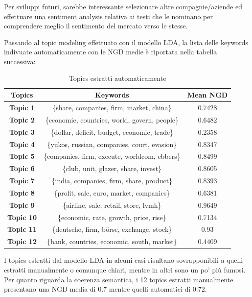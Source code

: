 \documentclass[]{article}
\begin{document}
Per sviluppi futuri, sarebbe interessante selezionare altre compagnie/aziende ed effettuare una sentiment analysis relativa ai testi che le nominano per comprendere meglio il sentimento del mercato verso le stesse.

Passando al topic modeling effettuato con il modello LDA, la lista delle keywords indivuate automaticamente con le NGD medie è riportata nella tabella successiva:

\begin{table}[H]
	\begin{center}
	\begin{tabular}{|c|c|c|}
		\hline 
		\textbf{Topics} & \textbf{Keywords} & \textbf{Mean NGD} \\ 
		\hline 
		\textbf{Topic 1} & \{share, companies, firm, market, china\} & 0.7428 \\ 
		\hline 
		\textbf{Topic 2} & \{economic, countries, world, govern, people\} & 0.6482 \\ 
		\hline 
		\textbf{Topic 3} & \{dollar, deficit, budget, economic, trade\} & 0.2358 \\ 
		\hline 
		\textbf{Topic 4} & \{yukos, russian, companies, court, evasion\} & 0.8347 \\ 
		\hline 
		\textbf{Topic 5} & \{companies, firm, execute, worldcom, ebbers\} & 0.8499 \\ 
		\hline 
		\textbf{Topic 6} & \{club, unit, glazer, share, invest\} & 0.8605 \\ 
		\hline 
		\textbf{Topic 7} & \{india, companies, firm, share, product\} & 0.8393 \\ 
		\hline 
		\textbf{Topic 8} & \{profit, sale, euro, market, companies\} & 0.6381 \\ 
		\hline 
		\textbf{Topic 9} & \{airline, sale, retail, store, lvmh\} & 0.9649 \\ 
		\hline 
		\textbf{Topic 10} & \{economic, rate, growth, price, rise\} & 0.7134 \\ 
		\hline 
		\textbf{Topic 11} & \{deutsche, firm, börse, exchange, stock\}  & 0.93 \\ 
		\hline 
	    \textbf{Topic 12} & \{bank, countries, economic, south, market\} & 0.4409 \\ 
		\hline 
	\end{tabular} 	
	\caption{Topics estratti automaticamente}
	\end{center}
\end{table}
I topics estratti dal modello LDA in alcuni casi risultano sovrapponibili a quelli estratti manualmente o comunque chiari, mentre in altri sono un po' più fumosi. Per quanto riguarda la coerenza semantica, i 12 topics estratti manualmente presentano una NGD media di 0.7 mentre quelli automatici di 0.72. 
\end{document}
